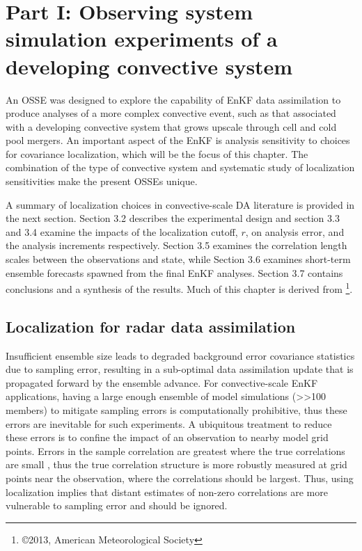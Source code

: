 \chapter{Part I: Observing system simulation experiments of a developing convective system}
\label{osse_chapter}
An OSSE was designed to explore the capability of EnKF data assimilation to produce analyses of a more complex convective event, such as that associated with a developing convective system that grows upscale through cell and cold pool mergers. An important aspect of the EnKF is analysis sensitivity to choices for covariance localization, which will be the focus of this chapter. The combination of the type of convective system and systematic study of localization sensitivities make the present OSSEs unique.

A summary of localization choices in convective-scale DA literature is provided in the next section. Section 3.2 describes the experimental design and section 3.3 and 3.4 examine the impacts of the localization cutoff, \( r \), on analysis error, and the analysis increments respectively. Section 3.5 examines the correlation length scales between the observations and state, while Section 3.6 examines short-term ensemble forecasts spawned from the final EnKF analyses. Section 3.7 contains conclusions and a synthesis of the results. Much of this chapter is derived from \citet{sobashstensrud13}\footnote{\copyright 2013, American Meteorological Society}.

\section{Localization for radar data assimilation}
Insufficient ensemble size leads to degraded background error covariance statistics due to sampling error, resulting in a sub-optimal data assimilation update that is propagated forward by the ensemble advance. For convective-scale EnKF applications, having a large enough ensemble of model simulations (\textgreater\textgreater 100 members) to mitigate sampling errors is computationally prohibitive, thus these errors are inevitable for such experiments. A ubiquitous treatment to reduce these errors is to confine the impact of an observation to nearby model grid points. Errors in the sample correlation are greatest where the true correlations are small \citep{fisher15}, thus the true correlation structure is more robustly measured at grid points near the observation, where the correlations should be largest. Thus, using localization implies that distant estimates of non-zero correlations are more vulnerable to sampling error and should be ignored.

